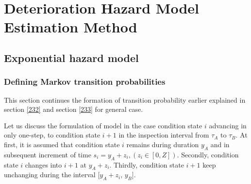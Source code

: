 \section{Deterioration Hazard Model Estimation Method}
\label{24}
\subsection{Exponential hazard model}
\label{241}
\subsubsection{Defining Markov transition probabilities}
\label{2411}
This section continues the formation of transition probability earlier explained in section \ref{232} and section \ref{233} for general case.

Let us discuss the formulation of model in the case condition state $i$ advancing in only one-step, to condition state $i+1$ in the inspection interval from $\tau_A$ to $\tau_B$. At first, it is assumed that condition state $i$ remains during duration $y_A$ and in subsequent increment of time $s_i=y_A+z_i, (z_i\in [0,Z])$. Secondly, condition state $i$ changes into $i+1$ at $y_A+z_i$. Thirdly, condition state $i+1$ keep unchanging during the interval $[y_A+z_i$, $y_B]$.


